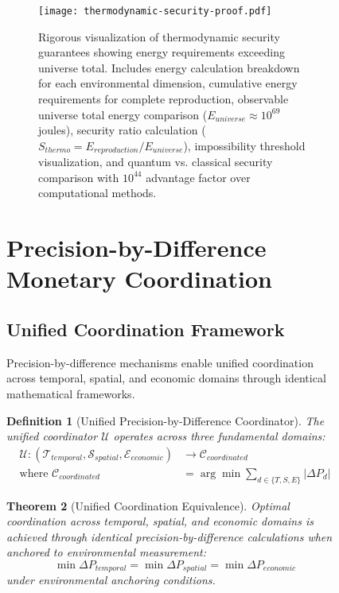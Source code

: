 \documentclass[12pt,a4paper]{article}
\newtheorem{theorem}{Theorem}
\newtheorem{definition}[theorem]{Definition}
\begin{document}
\begin{figure}[H]
\begin{figure}[H]
\centering
\texttt{[image: thermodynamic-security-proof.pdf]}
\caption{Rigorous visualization of thermodynamic security guarantees showing energy requirements exceeding universe total. Includes energy calculation breakdown for each environmental dimension, cumulative energy requirements for complete reproduction, observable universe total energy comparison ($E_{universe} ≈ 10^{69}$ joules), security ratio calculation ($S_{thermo} = E_{reproduction}/E_{universe}$), impossibility threshold visualization, and quantum vs. classical security comparison with $10^{44}$ advantage factor over computational methods.}
\label{fig:thermodynamic_security}
\end{figure}

\section{Precision-by-Difference Monetary Coordination}

\subsection{Unified Coordination Framework}

Precision-by-difference mechanisms enable unified coordination across temporal, spatial, and economic domains through identical mathematical frameworks.

\begin{definition}[Unified Precision-by-Difference Coordinator]
The unified coordinator $\mathcal{U}$ operates across three fundamental domains:
\begin{align}
\mathcal{U}: (\mathcal{T}_{temporal}, \mathcal{S}_{spatial}, \mathcal{E}_{economic}) &\to \mathcal{C}_{coordinated} \\
\text{where } \mathcal{C}_{coordinated} &= \arg\min \sum_{d \in \{T,S,E\}} |\Delta P_d|
\end{align}
\end{definition}

\begin{theorem}[Unified Coordination Equivalence]
Optimal coordination across temporal, spatial, and economic domains is achieved through identical precision-by-difference calculations when anchored to environmental measurement:
\begin{equation}
\min \Delta P_{temporal} = \min \Delta P_{spatial} = \min \Delta P_{economic}
\end{equation}
under environmental anchoring conditions.
\end{theorem}


\end{figure}
\end{document}
